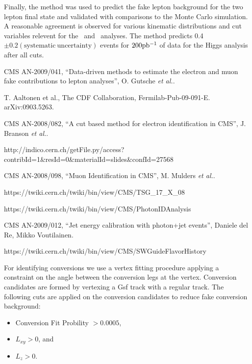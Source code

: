 \documentclass{cmspaper}
\begin{document}
Finally, the method was used to predict the fake lepton background for the two lepton final state and validated with comparisons to the Monte Carlo simulation. A reasonable agreement is observed for various kinematic distributions and cut variables relevent for the \WW\ and \HiggsToWW\ analyses. The method predicts 0.4$ \pm 0.2\mathrm{(systematic\ uncertainty)}$ events for $200\mathrm{pb^{-1}}$ of data for the Higgs analysis after all cuts.

\pagebreak

\vspace*{-0.2cm}

CMS AN-2009/041, ``Data-driven methods to estimate the electron and muon fake contributions to lepton analyses'',
O. Gutsche \textit{et al.}.

T. Aaltonen et al., The CDF Collaboration, Fermilab-Pub-09-091-E. arXiv:0903.5263.

CMS AN-2008/082, ``A cut based method for electron identification in CMS'',
J. Branson \textit{et al.}.

http://indico.cern.ch/getFile.py/access?contribId=1\&resId=0\&materialId=slides\&confId=27568

CMS AN-2008/098, ``Muon Identification in CMS'',
M. Mulders \textit{et al.}.

https://twiki.cern.ch/twiki/bin/view/CMS/TSG\_17\_X\_08 

https://twiki.cern.ch/twiki/bin/view/CMS/PhotonIDAnalysis

CMS AN-2009/012, ``Jet energy calibration with photon+jet events'',
Daniele del Re, Mikko Voutilainen.

https://twiki.cern.ch/twiki/bin/view/CMS/SWGuideFlavorHistory
\newpage

\clearpage
\appendix 

\label{app:conversionveto}
For identifying conversions we use a vertex fitting procedure applying a constraint on the angle between the conversion legs at the vertex. Conversion candidates are formed by vertexing a Gsf track with a regular track. The following cuts are applied on the conversion candidates to reduce fake conversion background:

\begin{itemize}
\item Conversion Fit Probility $> 0.0005$,
\item $L_{xy} > 0$, and
\item $L_z > 0$.
\end{itemize}
\end{document}
